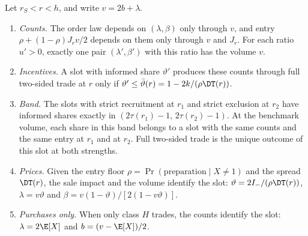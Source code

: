 \begin{proposition}\label{prop:informedshare}
Let \(r_S<r<h\), and write \(v=2b+\lambda\).
\begin{enumerate}[label=(\alph*),leftmargin=2em]
\item \emph{Counts.} The order law depends on \((\lambda,\beta)\) only through \(v\), and entry
\(\rho+(1-\rho)J_rv/2\) depends on them only through \(v\) and \(J_r\). For each ratio \(u'>0\), exactly one pair
\((\lambda',\beta')\) with this ratio has the volume \(v\).
\item \emph{Incentives.} A slot with informed share \(\vartheta'\) produces these counts through full two-sided trade
at \(r\) only if \(\vartheta'\le\bar\vartheta(r)=1-2k/(\rho\DT(r))\).
\item \emph{Band.} The slots with strict recruitment at \(r_1\) and strict exclusion at \(r_2\) have informed shares
exactly in \((2\tau(r_1)-1,\,2\tau(r_2)-1)\). At the benchmark
volume, each share in this band belongs to a slot with the same counts and the same entry at \(r_1\) and at \(r_2\).
Full two-sided trade is the unique outcome of this slot at both strengths.
\item \emph{Prices.} Given the entry floor \(\rho=\Pr(\text{preparation}\mid X\ne1)\) and the spread \(\DT(r)\), the
sale impact and the volume identify the slot: \(\vartheta=2I_-/(\rho\DT(r))\), \(\lambda=v\vartheta\) and
\(\beta=v(1-\vartheta)/[2(1-v\vartheta)]\).
\item \emph{Purchases only.} When only class \(H\) trades, the counts identify the slot: \(\lambda=2\E[X]\) and
\(b=(v-\E[X])/2\).
\end{enumerate}
\end{proposition}

